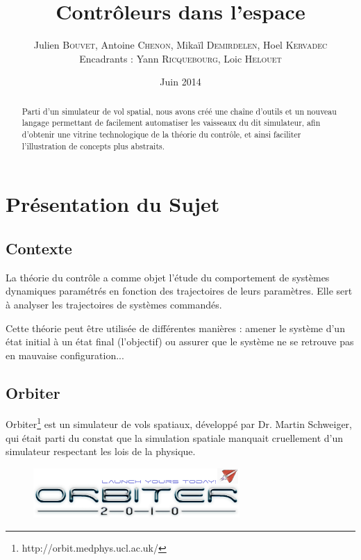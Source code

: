 \documentclass[a4paper,11pt]{article}
\title{\textbf{Contrôleurs dans l'espace}}
\author{Julien \textsc{Bouvet}, Antoine \textsc{Chenon}, Mikaïl \textsc{Demirdelen}, Hoel \textsc{Kervadec}
        \\
        Encadrants : Yann \textsc{Ricquebourg}, Loic \textsc{Helouet}}
\date{Juin 2014}
\begin{document}
\thispagestyle{empty}

\maketitle
\begin{abstract}
    Parti d'un simulateur de vol spatial, nous avons créé une chaîne d'outils et un nouveau langage permettant de facilement automatiser les vaisseaux du dit simulateur, afin d'obtenir une vitrine technologique de la théorie du contrôle, et ainsi faciliter l'illustration de concepts plus abstraits.
\end{abstract}

\section{Présentation du Sujet}
    \subsection{Contexte}
        La théorie du contrôle a comme objet l'étude du comportement de systèmes dynamiques paramétrés en fonction des trajectoires de leurs paramètres. Elle sert à analyser les trajectoires de systèmes commandés.
				
				Cette théorie peut être utilisée de différentes manières : amener le système d'un état initial à un état final (l'objectif) ou assurer que le système ne se retrouve pas en mauvaise configuration...

    \subsection{Orbiter}
        Orbiter\footnote{http://orbit.medphys.ucl.ac.uk/} est un simulateur de vols spatiaux, développé par Dr. Martin Schweiger, qui était parti du constat que la simulation spatiale manquait cruellement d'un simulateur respectant les lois de la physique.

        \begin{figure}[!h]
            \begin{center}
                \includegraphics[width=0.7\textwidth]{img/orbiter_logo.png}
            \end{center}
        \end{figure}
\end{document}
